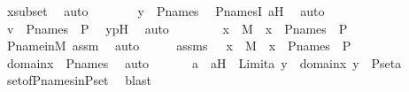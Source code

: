 \begin{isabellebody}
\ xsubset\ \isamarkupfalse%
\ auto\isanewline
\ \ \ \ \isamarkupfalse%
\ \isamarkupfalse%
\ {\isachardoublequoteopen}y\ {\isasymin}\ P{\isacharunderscore}{\kern0pt}names{\isachardoublequoteclose}\ \isamarkupfalse%
\ P{\isacharunderscore}{\kern0pt}namesI\ aH\ \isamarkupfalse%
\ auto\isanewline
\ \ \ \ \isamarkupfalse%
\ \isamarkupfalse%
\ {\isachardoublequoteopen}v\ {\isasymin}\ P{\isacharunderscore}{\kern0pt}names\ {\isasymtimes}\ P{\isachardoublequoteclose}\ \isamarkupfalse%
\ ypH\ \isamarkupfalse%
\ auto\isanewline
\ \ \isamarkupfalse%
\isanewline
\ \ \isamarkupfalse%
\ \isamarkupfalse%
\ {\isachardoublequoteopen}x\ {\isasymin}\ M\ {\isasymand}\ x\ {\isasymsubseteq}\ P{\isacharunderscore}{\kern0pt}names\ {\isasymtimes}\ P{\isachardoublequoteclose}\ \isamarkupfalse%
\ P{\isacharunderscore}{\kern0pt}name{\isacharunderscore}{\kern0pt}in{\isacharunderscore}{\kern0pt}M\ assm\ \isamarkupfalse%
\ auto\isanewline
{}\isamarkupfalse%
\ \isanewline
\ \ \isamarkupfalse%
\ assms\ {\isacharcolon}{\kern0pt}\ {\isachardoublequoteopen}\ x\ {\isasymin}\ M\ {\isasymand}\ x\ {\isasymsubseteq}\ P{\isacharunderscore}{\kern0pt}names\ {\isasymtimes}\ P\ {\isachardoublequoteclose}\ \isanewline
\ \ \isamarkupfalse%
\ \isamarkupfalse%
\ {\isachardoublequoteopen}domain{\isacharparenleft}{\kern0pt}x{\isacharparenright}{\kern0pt}\ {\isasymsubseteq}\ P{\isacharunderscore}{\kern0pt}names{\isachardoublequoteclose}\ \isamarkupfalse%
\ auto\ \isanewline
\ \ \isamarkupfalse%
\ \isamarkupfalse%
\ a\ \ aH\ {\isacharcolon}{\kern0pt}\ {\isachardoublequoteopen}Limit{\isacharparenleft}{\kern0pt}a{\isacharparenright}{\kern0pt}{\isachardoublequoteclose}\ {\isachardoublequoteopen}{\isasymforall}y\ {\isasymin}\ domain{\isacharparenleft}{\kern0pt}x{\isacharparenright}{\kern0pt}{\isachardot}{\kern0pt}\ y\ {\isasymin}\ P{\isacharunderscore}{\kern0pt}set{\isacharparenleft}{\kern0pt}a{\isacharparenright}{\kern0pt}{\isachardoublequoteclose}\ \isanewline
\ \ \ \ \isamarkupfalse%
\ set{\isacharunderscore}{\kern0pt}of{\isacharunderscore}{\kern0pt}P{\isacharunderscore}{\kern0pt}names{\isacharunderscore}{\kern0pt}in{\isacharunderscore}{\kern0pt}P{\isacharunderscore}{\kern0pt}set\ \isamarkupfalse%
\ blast\isanewline

\end{isabellebody}
